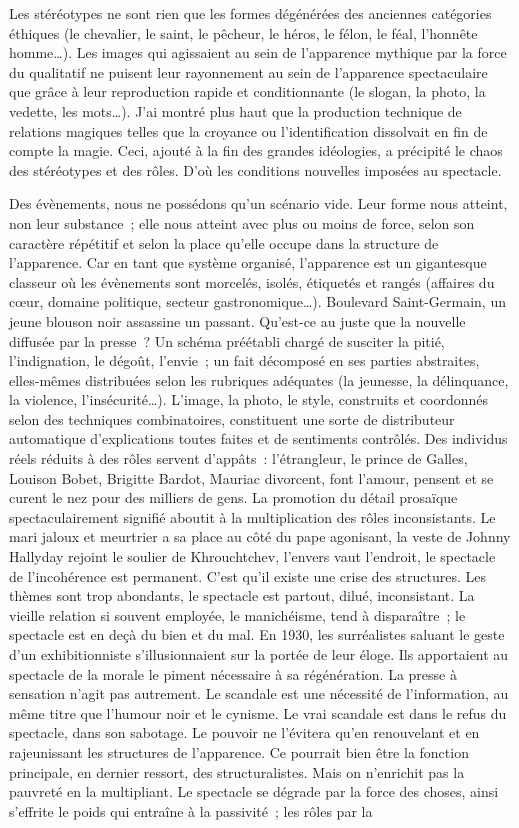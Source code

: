 \documentclass[french,twoside]{book} %
\begin{document}
Les stéréotypes ne sont rien que les formes dégénérées des anciennes catégories éthiques (le chevalier, le saint, le pêcheur, le héros, le félon, le féal, l’honnête homme…). Les images qui agissaient au sein de l’apparence mythique par la force du qualitatif ne puisent leur rayonnement au sein de l’apparence spectaculaire que grâce à leur reproduction rapide et conditionnante (le slogan, la photo, la vedette, les mots…). J’ai montré plus haut que la production technique de relations magiques telles que la croyance ou l’identification dissolvait en fin de compte la magie. Ceci, ajouté à la fin des grandes idéologies, a précipité le chaos des stéréotypes et des rôles. D’où les conditions nouvelles imposées au spectacle.\par
Des évènements, nous ne possédons qu’un scénario vide. Leur forme nous atteint, non leur substance ; elle nous atteint avec plus ou moins de force, selon son caractère répétitif et selon la place qu’elle occupe dans la structure de l’apparence. Car en tant que système organisé, l’apparence est un gigantesque classeur où les évènements sont morcelés, isolés, étiquetés et rangés (affaires du cœur, domaine politique, secteur gastronomique…). Boulevard Saint-Germain, un jeune blouson noir assassine un passant. Qu’est-ce au juste que la nouvelle diffusée par la presse ? Un schéma préétabli chargé de susciter la pitié, l’indignation, le dégoût, l’envie ; un fait décomposé en ses parties abstraites, elles-mêmes distribuées selon les rubriques adéquates (la jeunesse, la délinquance, la violence, l’insécurité…). L’image, la photo, le style, construits et coordonnés selon des techniques combinatoires, constituent une sorte de distributeur automatique d’explications toutes faites et de sentiments contrôlés. Des individus réels réduits à des rôles servent d’appâts : l’étrangleur, le prince de Galles, Louison Bobet, Brigitte Bardot, Mauriac divorcent, font l’amour, pensent et se curent le nez pour des milliers de gens. La promotion du détail prosaïque spectaculairement signifié aboutit à la multiplication des rôles inconsistants. Le mari jaloux et meurtrier a sa place au côté du pape agonisant, la veste de Johnny Hallyday rejoint le soulier de Khrouchtchev, l’envers vaut l’endroit, le spectacle de l’incohérence est permanent. C’est qu’il existe une crise des structures. Les thèmes sont trop abondants, le spectacle est partout, dilué, inconsistant. La vieille relation si souvent employée, le manichéisme, tend à disparaître ; le spectacle est en deçà du bien et du mal. En 1930, les surréalistes saluant le geste d’un exhibitionniste s’illusionnaient sur la portée de leur éloge. Ils apportaient au spectacle de la morale le piment nécessaire à sa régénération. La presse à sensation n’agit pas autrement. Le scandale est une nécessité de l’information, au même titre que l’humour noir et le cynisme. Le vrai scandale est dans le refus du spectacle, dans son sabotage. Le pouvoir ne l’évitera qu’en renouvelant et en rajeunissant les structures de l’apparence. Ce pourrait bien être la fonction principale, en dernier ressort, des structuralistes. Mais on n’enrichit pas la pauvreté en la multipliant. Le spectacle se dégrade par la force des choses, ainsi s’effrite le poids qui entraîne à la passivité ; les rôles par la 
\end{document}
